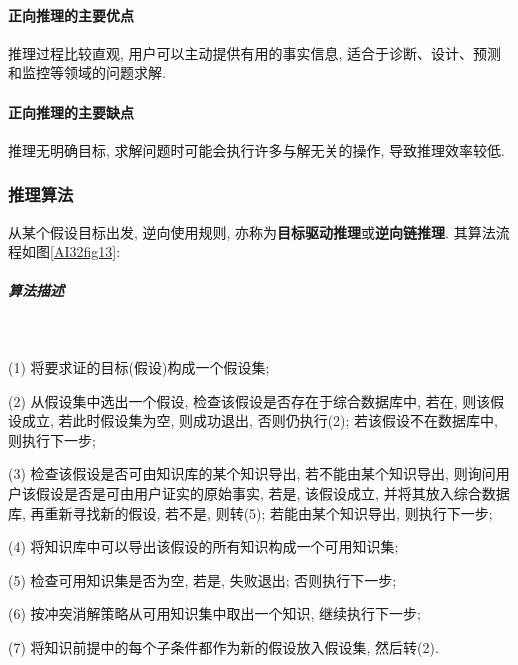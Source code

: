 \paragraph{正向推理的主要优点}
推理过程比较直观, 用户可以主动提供有用的事实信息, 适合于诊断、设计、预测和监控等领域的问题求解.
\paragraph{正向推理的主要缺点}
推理无明确目标, 求解问题时可能会执行许多与解无关的操作, 导致推理效率较低.
\subsubsection{推理算法}

从某个假设目标出发, 逆向使用规则, 亦称为\textbf{目标驱动推理}或\textbf{逆向链推理}.
其算法流程如图\ref{AI32fig13}:
\subparagraph{算法描述}~{}

(1) 将要求证的目标(假设)构成一个假设集;

(2) 从假设集中选出一个假设, 检查该假设是否存在于综合数据库中, 若在, 则该假设成立, 若此时假设集为空, 则成功退出, 否则仍执行(2); 若该假设不在数据库中, 则执行下一步;

(3) 检查该假设是否可由知识库的某个知识导出, 若不能由某个知识导出, 则询问用户该假设是否是可由用户证实的原始事实, 若是, 该假设成立, 并将其放入综合数据库, 再重新寻找新的假设, 若不是, 则转(5); 若能由某个知识导出, 则执行下一步;

(4) 将知识库中可以导出该假设的所有知识构成一个可用知识集;

(5) 检查可用知识集是否为空, 若是, 失败退出; 否则执行下一步;

(6) 按冲突消解策略从可用知识集中取出一个知识, 继续执行下一步;

(7) 将知识前提中的每个子条件都作为新的假设放入假设集, 然后转(2).

